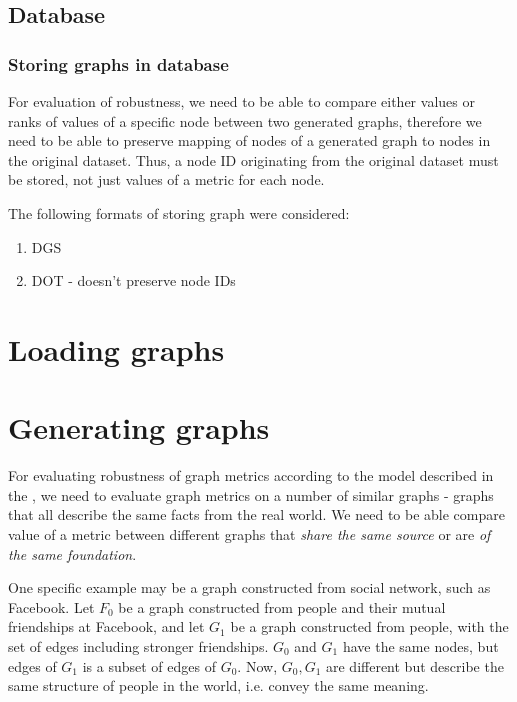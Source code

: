     \subsection{Database}
    
        \subsubsection{Storing graphs in database}
        
            For evaluation of robustness, we need to be able to compare either values or ranks of values of a specific node between two generated graphs, therefore we need to be able to preserve mapping of nodes of a generated graph to nodes in the original dataset. Thus, a node ID originating from the original dataset must be stored, not just values of a metric for each node.
            
            The following formats of storing graph were considered:
            \begin{enumerate}
                \item DGS
                \item DOT - doesn't preserve node IDs
            \end{enumerate}

\section{Loading graphs}

\section{Generating graphs}

    For evaluating robustness of graph metrics according to the model described in the , we need to evaluate graph metrics on a number of similar graphs - graphs that all describe the same facts from the real world. We need to be able compare value of a metric between different graphs that \textit{share the same source} or are \textit{of the same foundation}.
    
    One specific example may be a graph constructed from social network, such as Facebook. Let $F_0$ be a graph constructed from people and their mutual friendships at Facebook, and let $G_1$ be a graph constructed from people, with the set of edges including stronger friendships. $G_0$ and $G_1$ have the same nodes, but edges of $G_1$ is a subset of edges of $G_0$. Now, $G_0, G_1$ are different but describe the same structure of people in the world, i.e. convey the same meaning.
    
